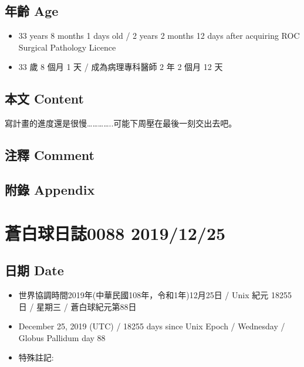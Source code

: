 \documentclass[
]{article}
\providecommand{\tightlist}{%
  \setlength{\itemsep}{0pt}\setlength{\parskip}{0pt}}
\begin{document}
\hypertarget{ux5e74ux9f61-age-23}{%
\subsection{年齡 Age}\label{ux5e74ux9f61-age-23}}

\begin{itemize}
\tightlist
\item
  33 years 8 months 1 days old / 2 years 2 months 12 days after
  acquiring ROC Surgical Pathology Licence
\item
  33 歲 8 個月 1 天 / 成為病理專科醫師 2 年 2 個月 12 天
\end{itemize}

\hypertarget{ux672cux6587-content-23}{%
\subsection{本文 Content}\label{ux672cux6587-content-23}}

寫計畫的進度還是很慢\ldots\ldots\ldots\ldots..可能下周壓在最後一刻交出去吧。

\hypertarget{ux6ce8ux91cb-comment-22}{%
\subsection{注釋 Comment}\label{ux6ce8ux91cb-comment-22}}

\hypertarget{ux9644ux9304-appendix-23}{%
\subsection{附錄 Appendix}\label{ux9644ux9304-appendix-23}}

\hypertarget{ux84bcux767dux7403ux65e5ux8a8c0088-20191225}{%
\section{蒼白球日誌0088
2019/12/25}\label{ux84bcux767dux7403ux65e5ux8a8c0088-20191225}}

\hypertarget{ux65e5ux671f-date-24}{%
\subsection{日期 Date}\label{ux65e5ux671f-date-24}}

\begin{itemize}
\tightlist
\item
  世界協調時間2019年(中華民國108年，令和1年)12月25日 / Unix 紀元 18255
  日 / 星期三 / 蒼白球紀元第88日
\item
  December 25, 2019 (UTC) / 18255 days since Unix Epoch / Wednesday /
  Globus Pallidum day 88
\item
  特殊註記:
\end{itemize}
\end{document}
